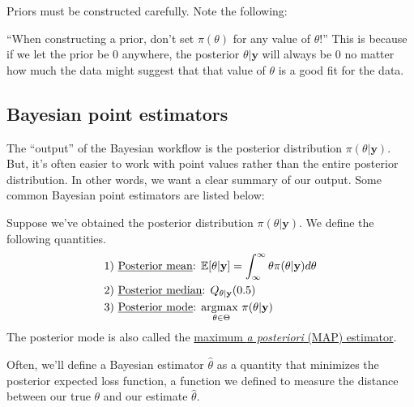 \documentclass[12pt]{article}
\newcommand{\E}{\mathbb{E}}
\begin{document}
\medskip

\noindent Priors must be constructed carefully. Note the following:

\medskip

\begin{tcolorbox}[breakable, title = \textbf{Remark}: Cromwell's rule]
    ``When constructing a prior, don't set $\pi(\theta)$ for any value of $\theta$!'' This is because if we let the prior be 0 anywhere, the posterior $\theta|\textbf{y}$ will always be 0 no matter how much the data might suggest that that value of $\theta$ is a good fit for the data.
\end{tcolorbox}

\subsection{Bayesian point estimators}

\noindent The ``output'' of the Bayesian workflow is the posterior distribution $\pi(\theta|\textbf{y})$. But, it's often easier to work with point values rather than the entire posterior distribution. In other words, we want a clear summary of our output. Some common Bayesian point estimators are listed below:

\medskip

\begin{tcolorbox}[breakable, title = \textbf{Definition}: \text{Posterior mean, median, mode}]
    Suppose we've obtained the posterior distribution $\pi(\theta|\textbf{y})$. We define the following quantities.
    \begin{align*}
        &1) \text{ \underline{Posterior mean}: }\E[\theta|\textbf{y}]  = \int_{\infty}^{\infty}\theta\pi(\theta|\textbf{y})d\theta\\
        &2) \text{ \underline{Posterior median}: }
        Q_{\theta|\textbf{y}}(0.5)\\
        &3) \text{ \underline{Posterior mode}: }
        \underset{\theta \in \Theta}{\text{argmax }}\pi(\theta|\textbf{y})
    \end{align*}
    The posterior mode is also called the \underline{maximum \emph{a posteriori} (MAP) estimator}.
\end{tcolorbox}

\medskip
\noindent Often, we'll define a Bayesian estimator $\hat\theta$ as a quantity that minimizes the posterior expected loss function, a function we defined to measure the distance between our true $\theta$ and our estimate $\hat\theta$.
\end{document}
